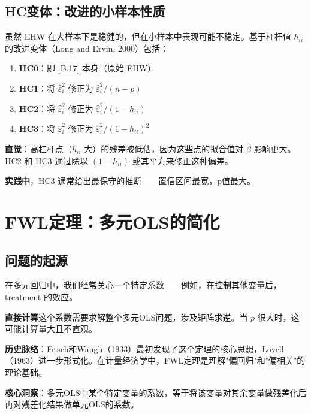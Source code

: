 
\subsection{HC变体：改进的小样本性质}\label{sec:B-hc-variants}

虽然 EHW 在大样本下是稳健的，但在小样本中表现可能不稳定。基于杠杆值 $h_{ii}$ 的改进变体（Long and Ervin, 2000）包括：

\begin{enumerate}
  \item \textbf{HC0}：即 \cref{B.17} 本身（原始 EHW）
  \item \textbf{HC1}：将 $\hat{\varepsilon}_i^2$ 修正为 $\hat{\varepsilon}_i^2 / (n-p)$
  \item \textbf{HC2}：将 $\hat{\varepsilon}_i^2$ 修正为 $\hat{\varepsilon}_i^2 / (1 - h_{ii})$
  \item \textbf{HC3}：将 $\hat{\varepsilon}_i^2$ 修正为 $\hat{\varepsilon}_i^2 / (1 - h_{ii})^2$
\end{enumerate}

\textbf{直觉}：高杠杆点（$h_{ii}$ 大）的残差被低估，因为这些点的拟合值对 $\hat{\beta}$ 影响更大。HC2 和 HC3 通过除以 $(1 - h_{ii})$ 或其平方来修正这种偏差。

\textbf{实践中}，HC3 通常给出最保守的推断——置信区间最宽，p值最大。

\section{FWL定理：多元OLS的简化}\label{sec:B-fwl}

\subsection{问题的起源}\label{sec:B-fwl-origin}

在多元回归中，我们经常关心一个特定系数——例如，在控制其他变量后，treatment 的效应。

\textbf{直接计算}这个系数需要求解整个多元OLS问题，涉及矩阵求逆。当 $p$ 很大时，这可能计算量大且不直观。

\textbf{历史脉络}：Frisch和Waugh（1933）最初发现了这个定理的核心思想，Lovell（1963）进一步形式化。在计量经济学中，FWL定理是理解"偏回归"和"偏相关"的理论基础。

\textbf{核心洞察}：多元OLS中某个特定变量的系数，等于将该变量对其余变量做残差化后再对残差化结果做单元OLS的系数。

